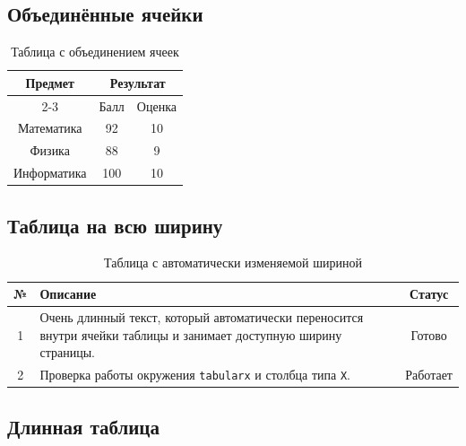 \documentclass[12pt,a4paper]{article}
\theoremstyle{definition}
\theoremstyle{remark}
\begin{document}
\subsection{Объединённые ячейки}

\begin{table}[H]
    \centering
    \caption{Таблица с объединением ячеек}

    \begin{tabular}{|c|c|c|}
        \hline
        \multirow{2}{*}{Предмет} &
        \multicolumn{2}{c|}{Результат}\\
        \cline{2-3}
        & Балл & Оценка\\
        \hline
        Математика & 92 & 10\\
        \hline
        Физика & 88 & 9\\
        \hline
        Информатика & 100 & 10\\
        \hline
    \end{tabular}
\end{table}

\subsection{Таблица на всю ширину}

\begin{table}[H]
    \centering
    \caption{Таблица с автоматически изменяемой шириной}

    \begin{tabularx}{\textwidth}{|c|X|c|}
        \hline
        \textbf{№} &
        \textbf{Описание} &
        \textbf{Статус}\\
        \hline
        1 &
        Очень длинный текст, который автоматически переносится внутри
        ячейки таблицы и занимает доступную ширину страницы. &
        Готово\\
        \hline
        2 &
        Проверка работы окружения \texttt{tabularx} и столбца типа
        \texttt{X}. &
        Работает\\
        \hline
    \end{tabularx}
\end{table}

\subsection{Длинная таблица}
\end{document}
